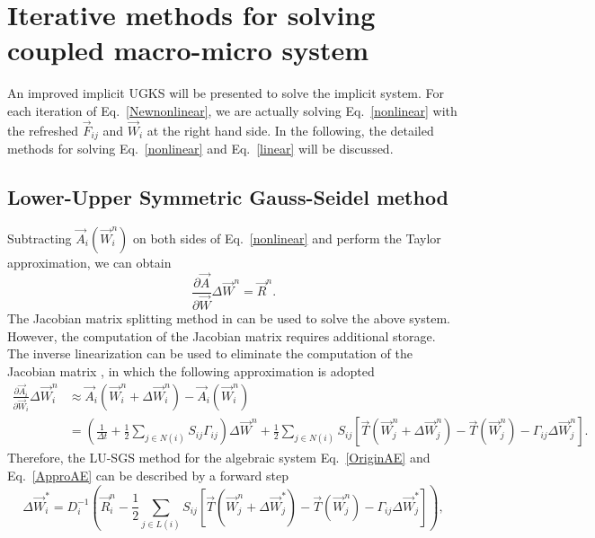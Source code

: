 \documentclass[3p,12pt]{elsarticle}
\begin{document}
	
	
	
	
	\section{Iterative methods for solving coupled macro-micro system}\label{Numeric}
	An improved implicit UGKS will be presented to solve the implicit system.
	For each iteration of Eq.~\eqref{Newnonlinear}, we are actually solving Eq.~\eqref{nonlinear} with the refreshed $\vec{F}_{ij}$ and $\vec{W}_i$ at the right hand side.
	In the following, the detailed methods for solving Eq.~\eqref{nonlinear} and Eq.~\eqref{linear} will be discussed.
	\subsection{Lower-Upper Symmetric Gauss-Seidel method}
	Subtracting $\vec{A}_i(\vec{W}_i^n)$ on both sides of Eq.~\eqref{nonlinear} and perform the Taylor approximation, we can obtain
	\begin{equation}
		\frac{\partial \vec{A}}{\partial \vec{W}}\Delta \vec{W}^n = \vec{R}^n.
		\label{OriginAE}\end{equation}
	The Jacobian matrix splitting method in \cite{yoon1988lower} can be used to solve the above system. 
However, the computation of the Jacobian matrix requires additional storage. The inverse linearization can be used to eliminate the computation of the Jacobian matrix \cite{sharov1997reordering}, in which the following approximation is adopted
	\begin{equation}
		\begin{aligned}
			\frac{\partial \vec{A}_i}{\partial \vec{W}_i}\Delta \vec{W}_i^n &\approx \vec{A}_i\left(\vec{W}_i^{n} +\Delta \vec{W}_i^n \right) - \vec{A}_i\left(\vec{W}_i^{n} \right) \\
			& = \left(\frac{1}{\Delta t} + \frac{1}{2}\sum_{j \in N(i)}S_{ij}\Gamma_{ij} \right)\Delta \vec{W}^{n} + \frac{1}{2}\sum_{j \in N(i)} S_{ij}\left[ \vec{T}\left(\vec{W}_{j}^{n} + \Delta\vec{W}_j^{n} \right) - \vec{T}\left( \vec{W}_j^n\right)  -\Gamma_{ij}\Delta\vec{W}_j^n \right].
		\end{aligned}
		\label{ApproAE}\end{equation}
	Therefore, the LU-SGS method for the algebraic system Eq.~\eqref{OriginAE} and Eq.~\eqref{ApproAE} can be described by a forward step
	\begin{equation}
		\Delta \vec{W}_{i}^{*} = D_i^{-1} \left( \vec{R}_i^n - \frac{1}{2}\sum_{j \in L(i)} S_{ij}\left[ \vec{T}\left(\vec{W}_{j}^{n} + \Delta\vec{W}_j^{*} \right) - \vec{T}\left( \vec{W}_j^n\right)  -\Gamma_{ij}\Delta\vec{W}_j^* \right] \right),
	\end{equation}
\end{document}
